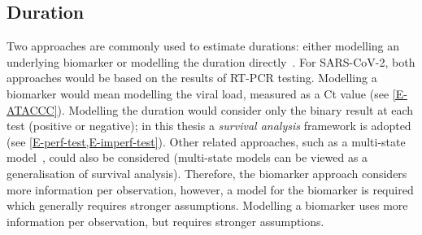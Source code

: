 \documentclass[thesis.tex]{subfiles}
\begin{document}

\subsection{Duration} \label{inc-prev:sec:duration}

Two approaches are commonly used to estimate durations: either modelling an underlying biomarker or modelling the duration directly~\autocite{sweetingEstimating}.
For SARS-CoV-2, both approaches would be based on the results of RT-PCR testing.
Modelling a biomarker would mean modelling the viral load, measured as a Ct value (see \cref{E-ATACCC}).
Modelling the duration would consider only the binary result at each test (positive or negative); in this thesis a \emph{survival analysis} framework is adopted (see \cref{E-perf-test,E-imperf-test}).
Other related approaches, such as a multi-state model~\autocite{jacksonMSM}, could also be considered (multi-state models can be viewed as a generalisation of survival analysis).
Therefore, the biomarker approach considers more information per observation, however, a model for the biomarker is required which generally requires stronger assumptions.
Modelling a biomarker uses more information per observation, but requires stronger assumptions.
\end{document}
